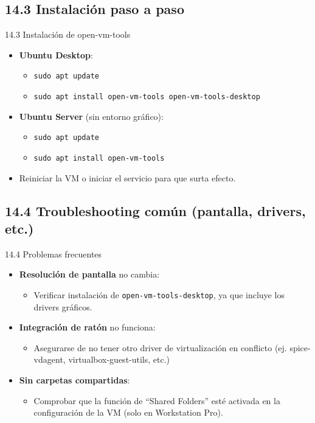 \documentclass{beamer}
\begin{document}
\subsection{14.3 Instalación paso a paso}
\begin{frame}{14.3 Instalación de open-vm-tools}
	\begin{itemize}
		\item \textbf{Ubuntu Desktop}:
			\begin{itemize}
				\item \texttt{sudo apt update}
				\item \texttt{sudo apt install open-vm-tools open-vm-tools-desktop}
			\end{itemize}
		\item \textbf{Ubuntu Server} (sin entorno gráfico):
			\begin{itemize}
				\item \texttt{sudo apt update}
				\item \texttt{sudo apt install open-vm-tools}
			\end{itemize}
		\item Reiniciar la VM o iniciar el servicio para que surta efecto.
	\end{itemize}
\end{frame}

\subsection{14.4 Troubleshooting común (pantalla, drivers, etc.)}
\begin{frame}{14.4 Problemas frecuentes}
	\begin{itemize}
		\item \textbf{Resolución de pantalla} no cambia:
			\begin{itemize}
				\item Verificar instalación de \texttt{open-vm-tools-desktop}, ya que incluye los drivers gráficos.
			\end{itemize}
		\item \textbf{Integración de ratón} no funciona:
			\begin{itemize}
				\item Asegurarse de no tener otro driver de virtualización en conflicto (ej. spice-vdagent, virtualbox-guest-utils, etc.)
			\end{itemize}
		\item \textbf{Sin carpetas compartidas}:
			\begin{itemize}
				\item Comprobar que la función de “Shared Folders” esté activada en la configuración de la VM (solo en Workstation Pro).
			\end{itemize}
	\end{itemize}
\end{frame}
\end{document}
